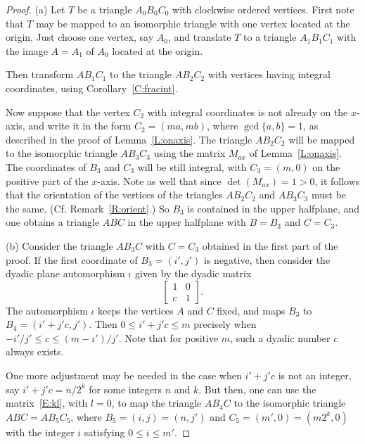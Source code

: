 \documentclass[12pt]{amsart}
\theoremstyle{plain}
\theoremstyle{definition}
\numberwithin{equation}{section}
\begin{document}
\begin{proof}
(a) Let $T$ be a triangle $A_0B_0C_0$ with clockwise ordered vertices.
First note that $T$ may be mapped to an isomorphic triangle with one vertex located at the
origin. Just choose one vertex, say $A_0$, and translate $T$ to a triangle $A_1B_1C_1$ with the image $A = A_1$ of $A_0$ located at the origin.


Then transform $AB_1C_1$ to the triangle $AB_2C_2$ with vertices having integral coordinates,
using Corollary~\ref{C:fracint}.


Now suppose that the vertex $C_2$ with integral coordinates is not already on the $x$-axis, and write it in the form $C_2 = (ma,mb)$, where $\gcd\{a,b\} = 1$, as described in the proof of Lemma~\ref{L:onaxis}. The triangle $AB_2C_2$ will be mapped to the isomorphic triangle $AB_3C_3$  using the matrix $M_{ax}$ of Lemma~\ref{L:onaxis}. The coordinates of $B_3$ and $C_3$ will be still integral, with $C_3 = (m,0)$ on the positive part of the $x$-axis.  Note as well that since $ \det (M_{ax}) = 1 > 0$, it follows that the orientation of the vertices of the triangles $AB_2C_2$ and $AB_3C_3$ must be the same. (Cf. Remark~\ref{R:orient}.) So $B_3$ is contained in the upper halfplane, and one obtains a triangle $ABC$ in the upper halfplane with $B = B_3$ and $C = C_3$.

(b) Consider the triangle $AB_3C$ with $C = C_3$ obtained in the first part of the proof. If the first coordinate of $B_3 = (i',j')$ is negative, then consider the dyadic plane automorphism $\iota$ given by the dyadic matrix
\begin{equation}\label{E:M}
\begin{bmatrix}
1 & 0 \\
c & 1
\end{bmatrix}
.
\end{equation}
The automorphism $\iota$ keeps the vertices $A$ and $C$ fixed, and maps $B_3$ to $B_4 = (i'+j'c,j')$. Then $0 \leq i'+j'c \leq m$ precisely when $-i'/j' \leq c \leq (m-i')/j'$.
Note that for positive $m$, such a dyadic number $c$ always exists.

One more adjustment may be needed in the case when $i'+j'c$ is not an integer, say $i'+j'c =
n/2^{k}$ for some integers $n$ and $k$. But then, one can use the matrix~\eqref{E:kl}, with $l = 0$, to map the triangle $AB_4C$ to the isomorphic triangle $ABC = AB_5C_5$, where $B_5 = (i,j) = (n,j')$ and $C_5 = (m',0) = (m2^k,0)$ with the integer $i$ satisfying $0 \leq i \leq m'$.
\end{proof}
\end{document}
